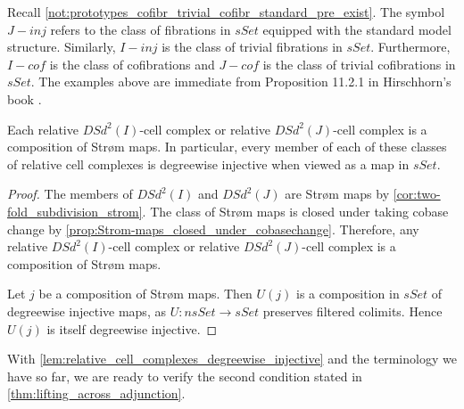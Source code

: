 Recall \cref{not:prototypes_cofibr_trivial_cofibr_standard_pre_exist}. The symbol $J-inj$ refers to the class of fibrations in $sSet$ equipped with the standard model structure. Similarly, $I-inj$ is the class of trivial fibrations in $sSet$. Furthermore, $I-cof$ is the class of cofibrations and $J-cof$ is the class of trivial cofibrations in $sSet$. The examples above are immediate from Proposition 11.2.1 in Hirschhorn's book \cite[p.~211]{Hi03}.
\begin{lemma}\label{lem:relative_cell_complexes_degreewise_injective}
Each relative $DSd^2(I)$-cell complex or relative $DSd^2(J)$-cell complex is a composition of Str\o m maps. In particular, every member of each of these classes of relative cell complexes is degreewise injective when viewed as a map in $sSet$.
\end{lemma}
\begin{proof}
The members of $DSd^2(I)$ and $DSd^2(J)$ are Str\o m maps by \cref{cor:two-fold_subdivision_strom}. The class of Str\o m maps is closed under taking cobase change by \cref{prop:Strom-maps_closed_under_cobasechange}. Therefore, any relative $DSd^2(I)$-cell complex or relative $DSd^2(J)$-cell complex is a composition of Str\o m maps.

Let $j$ be a composition of Str\o m maps. Then $U(j)$ is a composition in $sSet$ of degreewise injective maps, as $U:nsSet\to sSet$ preserves filtered colimits. Hence $U(j)$ is itself degreewise injective.
\end{proof}
\noindent With \cref{lem:relative_cell_complexes_degreewise_injective} and the terminology we have so far, we are ready to verify the second condition stated in \cref{thm:lifting_across_adjunction}.

